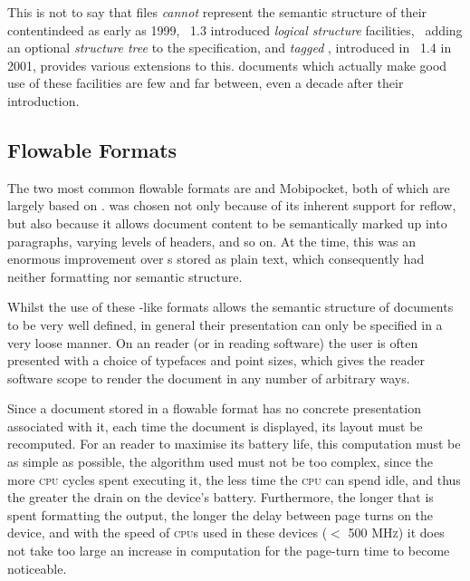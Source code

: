 This is not to say that \pdf{} files \emph{cannot} represent the semantic structure of their content\ed indeed as early as 1999, \pdf{}~1.3 introduced \emph{logical structure} facilities,~\cite{Adobe2001} adding an optional \emph{structure tree} to the \pdf{} specification, and \emph{tagged \pdf{}}, introduced in \pdf{}~1.4 in 2001, provides various extensions to this. \pdf{} documents which actually make good use of these facilities are few and far between, even a decade after their introduction.



\subsection{Flowable Formats}
\label{sec:flowableformats}

The two most common flowable \ebook{} formats are \epub{} and Mobipocket, both of which are largely based on \html{}. \html{} was chosen not only because of its inherent support for reflow, but also because it allows document content to be semantically marked up into paragraphs, varying levels of headers, and so on. At the time, this was an enormous improvement over \ebook{}s stored as plain text, which consequently had neither formatting nor semantic structure. 

Whilst the use of these \html{}-like formats allows the semantic structure of documents to be very well defined, in general their presentation can only be specified in a very loose manner. On an \ebook{} reader (or in \ebook{} reading software) the user is often presented with a choice of typefaces and point sizes, which gives the reader software scope to render the document in any number of arbitrary ways.

Since a document stored in a flowable format has no concrete presentation associated with it, each time the document is displayed, its layout must be recomputed. For an \ebook{} reader to maximise its battery life, this computation must be as simple as possible, \ie{} the algorithm used must not be too complex, since the more \textsc{cpu} cycles spent executing it, the less time the \textsc{cpu} can spend idle, and thus the greater the drain on the device's battery. Furthermore, the longer that is spent formatting the output, the longer the delay between page turns on the device, and with the speed of \textsc{cpu}s used in these devices ($<$ 500 \textsc{MHz}) it does not take too large an increase in computation for the page-turn time to become noticeable.


